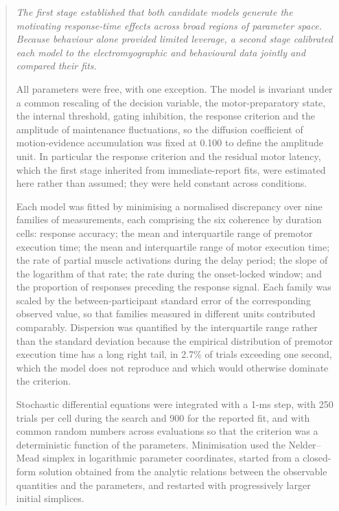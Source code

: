 \documentclass[a4paper,11pt]{article}
\newcommand{\1}{\mathbbm{1}}
\begin{document}
\begin{quote}\small\itshape
The first stage established that both candidate models generate the motivating
response-time effects across broad regions of parameter space. Because behaviour alone
provided limited leverage, a second stage calibrated each model to the
electromyographic and behavioural data jointly and compared their fits.

All parameters were free, with one exception. The model is invariant under a common
rescaling of the decision variable, the motor-preparatory state, the internal threshold,
gating inhibition, the response criterion and the amplitude of maintenance fluctuations,
so the diffusion coefficient of motion-evidence accumulation was fixed at 0.100 to
define the amplitude unit. In particular the response criterion and the residual motor
latency, which the first stage inherited from immediate-report fits, were estimated here
rather than assumed; they were held constant across conditions.

Each model was fitted by minimising a normalised discrepancy over nine families of
measurements, each comprising the six coherence by duration cells: response accuracy;
the mean and interquartile range of premotor execution time; the mean and interquartile
range of motor execution time; the rate of partial muscle activations during the delay
period; the slope of the logarithm of that rate; the rate during the onset-locked window;
and the proportion of responses preceding the response signal. Each family was scaled by
the between-participant standard error of the corresponding observed value, so that
families measured in different units contributed comparably. Dispersion was quantified
by the interquartile range rather than the standard deviation because the empirical
distribution of premotor execution time has a long right tail, in 2.7\% of trials
exceeding one second, which the model does not reproduce and which would otherwise
dominate the criterion.

Stochastic differential equations were integrated with a 1-ms step, with 250 trials per
cell during the search and 900 for the reported fit, and with common random numbers
across evaluations so that the criterion was a deterministic function of the parameters.
Minimisation used the Nelder--Mead simplex in logarithmic parameter coordinates, started
from a closed-form solution obtained from the analytic relations between the observable
quantities and the parameters, and restarted with progressively larger initial simplices.


\end{quote}
\end{document}
